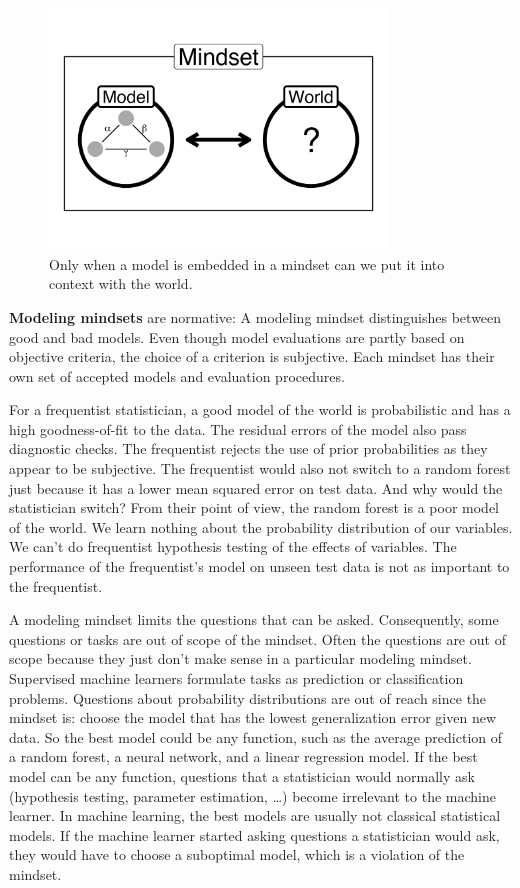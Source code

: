 \documentclass[
  10pt,
]{scrbook}
\begin{document}
\begin{figure}

{\centering \includegraphics[width=0.8\textwidth]{figures/mindsets-1} 

}

\caption{Only when a model is embedded in a mindset can we put it into context with the world.}\label{fig:mindsets}
\end{figure}

\textbf{Modeling mindsets} are normative:
A modeling mindset distinguishes between good and bad models.
Even though model evaluations are partly based on objective criteria, the choice of a criterion is subjective.
Each mindset has their own set of accepted models and evaluation procedures.

For a frequentist statistician, a good model of the world is probabilistic and has a high goodness-of-fit to the data.
The residual errors of the model also pass diagnostic checks.
The frequentist rejects the use of prior probabilities as they appear to be subjective.
The frequentist would also not switch to a random forest just because it has a lower mean squared error on test data.
And why would the statistician switch?
From their point of view, the random forest is a poor model of the world.
We learn nothing about the probability distribution of our variables.
We can't do frequentist hypothesis testing of the effects of variables.
The performance of the frequentist's model on unseen test data is not as important to the frequentist.

A modeling mindset limits the questions that can be asked.
Consequently, some questions or tasks are out of scope of the mindset.
Often the questions are out of scope because they just don't make sense in a particular modeling mindset.
Supervised machine learners formulate tasks as prediction or classification problems.
Questions about probability distributions are out of reach since the mindset is: choose the model that has the lowest generalization error given new data.
So the best model could be any function, such as the average prediction of a random forest, a neural network, and a linear regression model.
If the best model can be any function, questions that a statistician would normally ask (hypothesis testing, parameter estimation, \ldots) become irrelevant to the machine learner.
In machine learning, the best models are usually not classical statistical models.
If the machine learner started asking questions a statistician would ask, they would have to choose a suboptimal model, which is a violation of the mindset.
\end{document}
